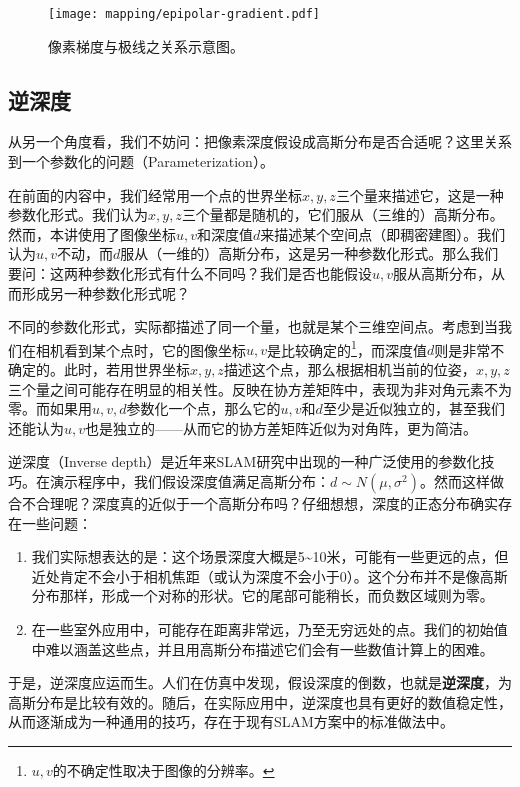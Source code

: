 \begin{figure}[!htp]
	\centering
	\texttt{[image: mapping/epipolar-gradient.pdf]}
	\caption{像素梯度与极线之关系示意图。}
	\label{fig:epipolar-gradient}
\end{figure}

\subsection{逆深度}
从另一个角度看，我们不妨问：把像素深度假设成高斯分布是否合适呢？这里关系到一个参数化的问题（Parameterization）。

\clearpage
在前面的内容中，我们经常用一个点的世界坐标$x,y,z$三个量来描述它，这是一种参数化形式。我们认为$x,y,z$三个量都是随机的，它们服从（三维的）高斯分布。然而，本讲使用了图像坐标$u,v$和深度值$d$来描述某个空间点（即稠密建图）。我们认为$u,v$不动，而$d$服从（一维的）高斯分布，这是另一种参数化形式。那么我们要问：这两种参数化形式有什么不同吗？我们是否也能假设$u,v$服从高斯分布，从而形成另一种参数化形式呢？

不同的参数化形式，实际都描述了同一个量，也就是某个三维空间点。考虑到当我们在相机看到某个点时，它的图像坐标$u,v$是比较确定的\footnote{$u,v$的不确定性取决于图像的分辨率。}，而深度值$d$则是非常不确定的。此时，若用世界坐标$x,y,z$描述这个点，那么根据相机当前的位姿，$x,y,z$三个量之间可能存在明显的相关性。反映在协方差矩阵中，表现为非对角元素不为零。而如果用$u,v,d$参数化一个点，那么它的$u,v$和$d$至少是近似独立的，甚至我们还能认为$u,v$也是独立的——从而它的协方差矩阵近似为对角阵，更为简洁。

逆深度（Inverse depth）是近年来SLAM研究中出现的一种广泛使用的参数化技巧\textsuperscript{\cite{Montiel2006, Civera2008}}。在演示程序中，我们假设深度值满足高斯分布：$d \sim N(\mu, \sigma^2)$。然而这样做合不合理呢？深度真的近似于一个高斯分布吗？仔细想想，深度的正态分布确实存在一些问题：

\begin{enumerate}
	\item 我们实际想表达的是：这个场景深度大概是5\textasciitilde10米，可能有一些更远的点，但近处肯定不会小于相机焦距（或认为深度不会小于0）。这个分布并不是像高斯分布那样，形成一个对称的形状。它的尾部可能稍长，而负数区域则为零。
	\item 在一些室外应用中，可能存在距离非常远，乃至无穷远处的点。我们的初始值中难以涵盖这些点，并且用高斯分布描述它们会有一些数值计算上的困难。
\end{enumerate}

于是，逆深度应运而生。人们在仿真中发现，假设深度的倒数，也就是\textbf{逆深度}，为高斯分布是比较有效的\textsuperscript{\cite{Civera2008}}。随后，在实际应用中，逆深度也具有更好的数值稳定性，从而逐渐成为一种通用的技巧，存在于现有SLAM方案中的标准做法中\textsuperscript{\cite{Forster2014, Engel2014, Mur-Artal2015}}。

